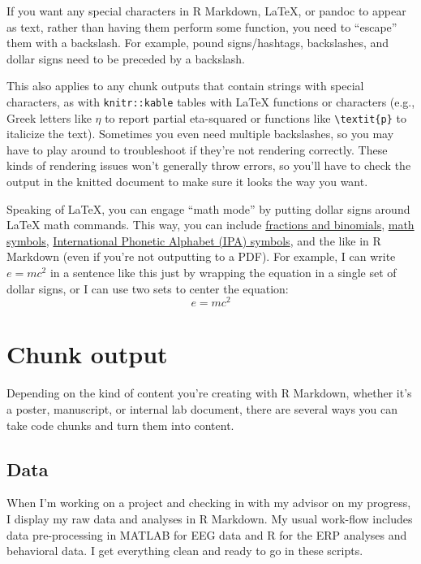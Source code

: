 \documentclass[
  openany]{book}
\begin{document}
If you want any special characters in R Markdown, LaTeX, or pandoc to appear as text, rather than having them perform some function, you need to ``escape'' them with a backslash. For example, pound signs/hashtags, backslashes, and dollar signs need to be preceded by a backslash.

This also applies to any chunk outputs that contain strings with special characters, as with \texttt{knitr::kable} tables with LaTeX functions or characters (e.g., Greek letters like \(\eta\) to report partial eta-squared or functions like \texttt{\textbackslash{}textit\{p\}} to italicize the text). Sometimes you even need multiple backslashes, so you may have to play around to troubleshoot if they're not rendering correctly. These kinds of rendering issues won't generally throw errors, so you'll have to check the output in the knitted document to make sure it looks the way you want.

Speaking of LaTeX, you can engage ``math mode'' by putting dollar signs around LaTeX math commands. This way, you can include \href{https://en.wikibooks.org/wiki/LaTeX/Mathematics\#Fractions_and_Binomials}{fractions and binomials}, \href{https://oeis.org/wiki/List_of_LaTeX_mathematical_symbols}{math symbols}, \href{https://www.tug.org/TUGboat/tb17-2/tb51rei.pdf}{International Phonetic Alphabet (IPA) symbols}, and the like in R Markdown (even if you're not outputting to a PDF). For example, I can write \(e = mc^2\) in a sentence like this just by wrapping the equation in a single set of dollar signs, or I can use two sets to center the equation: \[e = mc^2\]

\hypertarget{chunk-output}{%
\section{Chunk output}\label{chunk-output}}

Depending on the kind of content you're creating with R Markdown, whether it's a poster, manuscript, or internal lab document, there are several ways you can take code chunks and turn them into content.

\hypertarget{dat}{%
\subsection{Data}\label{dat}}

When I'm working on a project and checking in with my advisor on my progress, I display my raw data and analyses in R Markdown. My usual work-flow includes data pre-processing in MATLAB for EEG data and R for the ERP analyses and behavioral data. I get everything clean and ready to go in these scripts.
\end{document}
